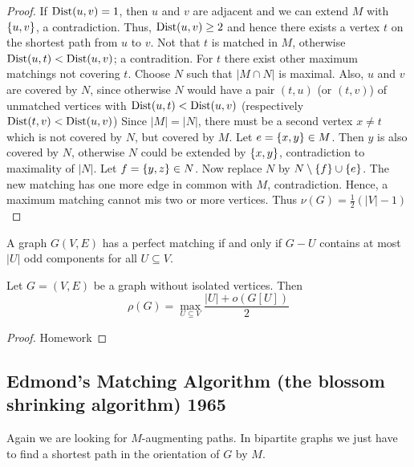 \begin{proof}
	If $\operatorname{Dist}(u,v)=1$, then $u$ and $v$ are adjacent and we can extend $M$ with 
	$\left\{u,v\right\}$, a contradiction. Thus, $\operatorname{Dist}(u,v)\geq 2$ and hence there 
	exists a vertex $t$ on the shortest path from $u$ to $v$. Not that $t$ is 
	matched in $M$, otherwise $\operatorname{Dist}(u,t)<\operatorname{Dist}(u,v)$; a contradition.	For $t$ 
	there exist other maximum matchings not covering $t$. Choose $N$ such that 
	$|M \cap N|$ is maximal. \newline
	Also, $u$ and $v$ are covered by $N$, since otherwise $N$ would have a pair
	$(t,u)$ (or $(t,v)$) of unmatched vertices with $\operatorname{Dist}(u,t) < \operatorname{Dist} (u,v)$ 
	(respectively $\operatorname{Dist}(t,v) < \operatorname{Dist}(u,v)$)\newline	
	Since $|M| = |N|$, there must be a second vertex $x\neq t$ which is not
	covered by $N$, but covered by $M$. Let $e=\left\{x,y\right\} \in M$. Then $y$ is
	also covered by $N$, otherwise $N$ could be extended by $\left\{x,y\right\}$, 
	contradiction to maximality of $|N|$. Let $f=\left\{y,z\right\}\in N$. Now
	replace $N$ by $N \setminus \left\{f\right\} \cup \left\{e\right\}$. The new matching 
	has one more edge in common with $M$, contradiction. \newline
	Hence, a maximum matching cannot mis two or more vertices. Thus $\nu (G) = 
	\frac12(|V|-1)$
	

	
\end{proof}

\begin{cor}
	A graph $G(V,E)$ has a perfect matching if and only if $G - U$ contains at
	most $|U|$ odd components for all $U \subseteq V$.
\end{cor}

\begin{cor}
	Let $G = (V,E)$ be a graph without isolated vertices. Then \[
		\rho(G) = \max_{U \subseteq V} \frac{|U| + o(G[U])}2
	\]
\end{cor}

\begin{proof}
	Homework
\end{proof}

\subsection*{Edmond's Matching Algorithm (the blossom shrinking algorithm) 1965}
	Again we are looking for $M$-augmenting paths. In bipartite graphs we just have 
	to find a shortest path in the orientation of $G$ by $M$. 
	
